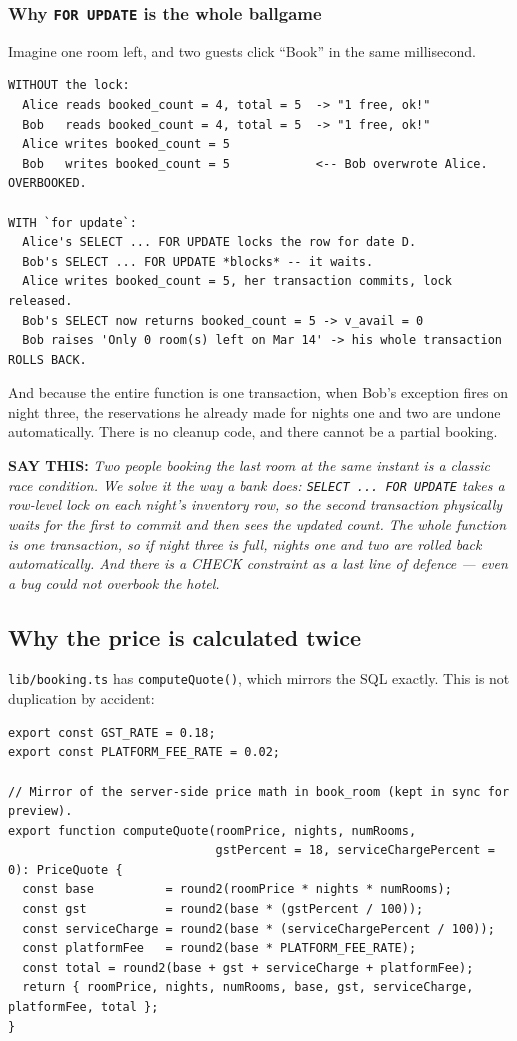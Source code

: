 \documentclass[11pt,a4paper]{article}
\newcommand{\saythis}[1]{\begin{saybox}\textbf{\small\color{primary}SAY THIS:} \textit{#1}\end{saybox}}
\newcommand{\file}[1]{\texttt{\small #1}}
\begin{document}
\subsubsection{Why \texttt{FOR UPDATE} is the whole ballgame}

Imagine one room left, and two guests click ``Book'' in the same millisecond.

\begin{lstlisting}
WITHOUT the lock:
  Alice reads booked_count = 4, total = 5  -> "1 free, ok!"
  Bob   reads booked_count = 4, total = 5  -> "1 free, ok!"
  Alice writes booked_count = 5
  Bob   writes booked_count = 5            <-- Bob overwrote Alice. OVERBOOKED.

WITH `for update`:
  Alice's SELECT ... FOR UPDATE locks the row for date D.
  Bob's SELECT ... FOR UPDATE *blocks* -- it waits.
  Alice writes booked_count = 5, her transaction commits, lock released.
  Bob's SELECT now returns booked_count = 5 -> v_avail = 0
  Bob raises 'Only 0 room(s) left on Mar 14' -> his whole transaction ROLLS BACK.
\end{lstlisting}

And because the entire function is one transaction, when Bob's exception fires on
night three, the reservations he already made for nights one and two are undone
automatically. There is no cleanup code, and there cannot be a partial booking.

\saythis{Two people booking the last room at the same instant is a classic race
condition. We solve it the way a bank does: \texttt{SELECT ... FOR UPDATE} takes a
row-level lock on each night's inventory row, so the second transaction physically
waits for the first to commit and then sees the updated count. The whole function
is one transaction, so if night three is full, nights one and two are rolled back
automatically. And there is a CHECK constraint as a last line of defence --- even a
bug could not overbook the hotel.}

\subsection{Why the price is calculated twice}

\file{lib/booking.ts} has \texttt{computeQuote()}, which mirrors the SQL exactly.
This is not duplication by accident:

\begin{lstlisting}[language=TS,caption={lib/booking.ts}]
export const GST_RATE = 0.18;
export const PLATFORM_FEE_RATE = 0.02;

// Mirror of the server-side price math in book_room (kept in sync for preview).
export function computeQuote(roomPrice, nights, numRooms,
                             gstPercent = 18, serviceChargePercent = 0): PriceQuote {
  const base          = round2(roomPrice * nights * numRooms);
  const gst           = round2(base * (gstPercent / 100));
  const serviceCharge = round2(base * (serviceChargePercent / 100));
  const platformFee   = round2(base * PLATFORM_FEE_RATE);
  const total = round2(base + gst + serviceCharge + platformFee);
  return { roomPrice, nights, numRooms, base, gst, serviceCharge, platformFee, total };
}
\end{lstlisting}
\end{document}

